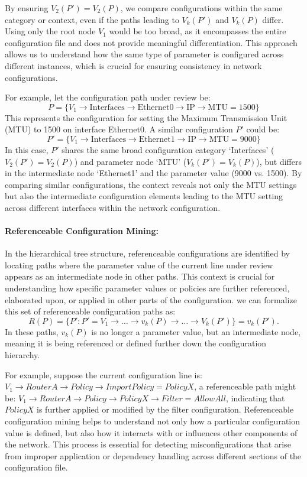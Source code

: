 By ensuring \(V_2(P') = V_2(P)\), we compare configurations within the same category or context, even if the paths leading to \( V_k(P') \) and \( V_k(P) \) differ. Using only the root node \( V_1 \) would be too broad, as it encompasses the entire configuration file and does not provide meaningful differentiation. This approach allows us to understand how the same type of parameter is configured across different instances, which is crucial for ensuring consistency in network configurations.



For example, let the configuration path under review be:
\[
P = \{ V_1 \rightarrow \text{Interfaces} \rightarrow \text{Ethernet0} \rightarrow \text{IP} \rightarrow \text{MTU} = 1500 \}
\]
This represents the configuration for setting the Maximum Transmission Unit (MTU) to 1500 on interface Ethernet0.
A similar configuration \( P' \) could be:
\[
P' = \{ V_1 \rightarrow \text{Interfaces} \rightarrow \text{Ethernet1} \rightarrow \text{IP} \rightarrow \text{MTU} = 9000 \}
\]
In this case, \( P' \) shares the same broad configuration category `Interfaces' (\( V_2(P') = V_2(P) \)) and parameter node `MTU' (\( V_k(P') = V_k(P) \)), but differs in the intermediate node `Ethernet1' and the parameter value (9000 vs. 1500). By comparing similar configurations, the context reveals not only the MTU settings but also the intermediate configuration elements leading to the MTU setting across different interfaces within the network configuration.


\paragraph{Referenceable Configuration Mining:} In the hierarchical tree structure, referenceable configurations are identified by locating paths where the parameter value of the current line under review appears as an intermediate node in other paths. This context is crucial for understanding how specific parameter values or policies are further referenced, elaborated upon, or applied in other parts of the configuration. we can formalize this set of referenceable configuration paths as:
\[
R(P) = \{ P' : P' =  V_1 \rightarrow \dots \rightarrow v_k(P) \rightarrow \dots \rightarrow V_k(P') \} = v_k(P').
\]
In these paths, \( v_k(P) \) is no longer a parameter value, but an intermediate node, meaning it is being referenced or defined further down the configuration hierarchy.

For example, suppose the current configuration line is:
\(V_1 \rightarrow RouterA \rightarrow Policy \rightarrow ImportPolicy = PolicyX\), a referenceable path might be:
\(
V_1 \rightarrow  RouterA \rightarrow Policy \rightarrow PolicyX \rightarrow Filter = AllowAll
\),
indicating that \( PolicyX \) is further applied or modified by the filter configuration. Referenceable configuration mining helps to understand not only how a particular configuration value is defined, but also how it interacts with or influences other components of the network. This process is essential for detecting misconfigurations that arise from improper application or dependency handling across different sections of the configuration file.


